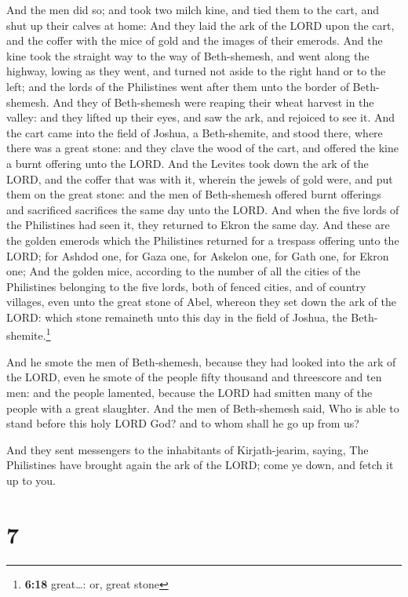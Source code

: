  And the men did so; and took two milch kine, and tied
them to the cart, and shut up their calves at home:  And
they laid the ark of the LORD upon the cart, and the coffer with the
mice of gold and the images of their emerods.  And the
kine took the straight way to the way of Beth-shemesh, and went along
the highway, lowing as they went, and turned not aside to the right hand
or to the left; and the lords of the Philistines went after them unto
the border of Beth-shemesh.  And they of Beth-shemesh
were reaping their wheat harvest in the valley: and they lifted up their
eyes, and saw the ark, and rejoiced to see it.  And the
cart came into the field of Joshua, a Beth-shemite, and stood there,
where there was a great stone: and they clave the wood of the cart, and
offered the kine a burnt offering unto the LORD.  And the
Levites took down the ark of the LORD, and the coffer that was with it,
wherein the jewels of gold were, and put them on the great stone: and
the men of Beth-shemesh offered burnt offerings and sacrificed
sacrifices the same day unto the LORD.  And when the five
lords of the Philistines had seen it, they returned to Ekron the same
day.  And these are the golden emerods which the
Philistines returned for a trespass offering unto the LORD; for Ashdod
one, for Gaza one, for Askelon one, for Gath one, for Ekron one;
 And the golden mice, according to the number of all the
cities of the Philistines belonging to the five lords, both of fenced
cities, and of country villages, even unto the great stone of Abel,
whereon they set down the ark of the LORD: which stone remaineth unto
this day in the field of Joshua, the Beth-shemite.\footnote{\textbf{6:18}
  great\ldots: or, great stone}

 And he smote the men of Beth-shemesh, because they had
looked into the ark of the LORD, even he smote of the people fifty
thousand and threescore and ten men: and the people lamented, because
the LORD had smitten many of the people with a great slaughter.
 And the men of Beth-shemesh said, Who is able to stand
before this holy LORD God? and to whom shall he go up from us?

 And they sent messengers to the inhabitants of
Kirjath-jearim, saying, The Philistines have brought again the ark of
the LORD; come ye down, and fetch it up to you.

\hypertarget{section-6}{%
\section{7}\label{section-6}}

